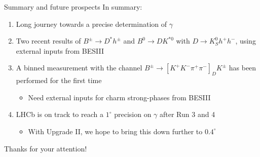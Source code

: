 \documentclass[dvipsnames]{beamer}
\begin{document}
\begin{frame}{Summary and future prospects}
  \vspace{0.0cm}
  {\Large In summary:}
  \vspace{0.3cm}
  \begin{enumerate}
    \setlength\itemsep{1.0em}
    \item{Long journey towards a precise determination of $\gamma$}
    \item{Two recent results of $B^\pm\to D^*h^\pm$ and $B^0\to DK^{*0}$ with $D\to K_S^0h^+h^-$, using external inputs from BESIII}
    \item{A binned measurement with the channel $B^\pm\to[K^+K^-\pi^+\pi^-]_DK^\pm$ has been performed for the first time}
    \begin{itemize}
      \item{Need external inputs for charm strong-phases from BESIII}
    \end{itemize}
    \item{LHCb is on track to reach a $1^\circ$ precision on $\gamma$ after Run 3 and 4}
    \begin{itemize}
      \item{With Upgrade II, we hope to bring this down further to $0.4^\circ$}
    \end{itemize}
  \end{enumerate}
  \vspace{0.4cm}
  \begin{center}
    {\huge Thanks for your attention!}
  \end{center}
\end{frame}

\begin{frame}{}
\end{frame}
\end{document}

